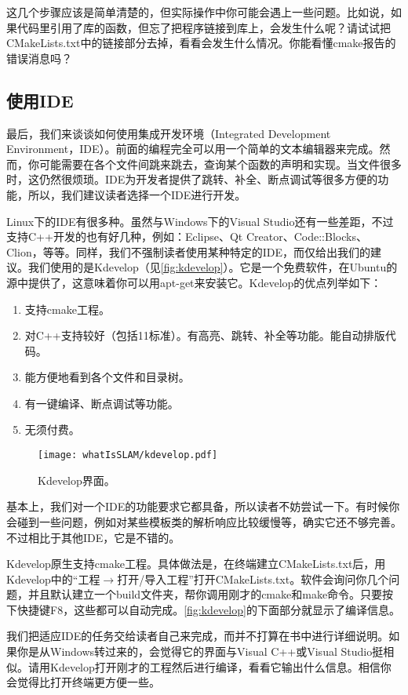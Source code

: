这几个步骤应该是简单清楚的，但实际操作中你可能会遇上一些问题。比如说，如果代码里引用了库的函数，但忘了把程序链接到库上，会发生什么呢？请试试把CMakeLists.txt中的链接部分去掉，看看会发生什么情况。你能看懂cmake报告的错误消息吗？

\subsection{使用IDE}
最后，我们来谈谈如何使用集成开发环境（Integrated Development Environment，IDE）。前面的编程完全可以用一个简单的文本编辑器来完成。然而，你可能需要在各个文件间跳来跳去，查询某个函数的声明和实现。当文件很多时，这仍然很烦琐。IDE为开发者提供了跳转、补全、断点调试等很多方便的功能，所以，我们建议读者选择一个IDE进行开发。

Linux下的IDE有很多种。虽然与Windows下的Visual Studio还有一些差距，不过支持C++开发的也有好几种，例如：Eclipse、Qt Creator、Code::Blocks、Clion，等等。同样，我们不强制读者使用某种特定的IDE，而仅给出我们的建议。我们使用的是Kdevelop（见\autoref{fig:kdevelop}）。它是一个免费软件，在Ubuntu的源中提供了，这意味着你可以用apt-get来安装它。Kdevelop的优点列举如下：

\begin{enumerate}
	\item 支持cmake工程。
	\item 对C++支持较好（包括11标准）。有高亮、跳转、补全等功能。能自动排版\mbox{代码。}
	\item 能方便地看到各个文件和目录树。
	\item 有一键编译、断点调试等功能。
	\item 无须付费。
\end{enumerate}

\begin{figure}[!ht]
	\centering
	\texttt{[image: whatIsSLAM/kdevelop.pdf]}
	\caption{Kdevelop界面。}
	\label{fig:kdevelop}
\end{figure}

基本上，我们对一个IDE的功能要求它都具备，所以读者不妨尝试一下。有时候你会碰到一些问题，例如对某些模板类的解析响应比较缓慢等，确实它还不够完善。不过相比于其他IDE，它是不错的。

Kdevelop原生支持cmake工程。具体做法是，在终端建立CMakeLists.txt后，用Kdevelop中的“工程$\rightarrow$打开/导入工程”打开CMakeLists.txt。软件会询问你几个问题，并且默认建立一个build文件夹，帮你调用刚才的cmake和make命令。只要按下快捷键F8，这些都可以自动完成。\autoref{fig:kdevelop}的下面部分就显示了编译信息。

我们把适应IDE的任务交给读者自己来完成，而并不打算在书中进行详细说明。如果你是从Windows转过来的，会觉得它的界面与Visual C++或Visual Studio挺相似。请用Kdevelop打开刚才的工程然后进行编译，看看它输出什么信息。相信你会觉得比打开终端更方便一些。


